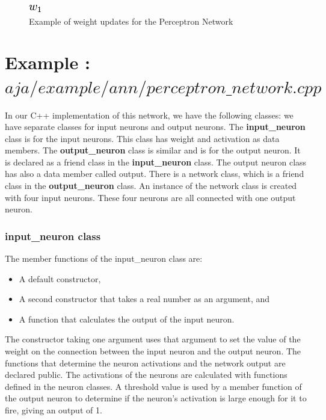 \documentclass[12pt, right open]{memoir}
\begin{document}
\begin{figure}
\caption{Example of weight updates for the Perceptron Network}
\label{tab:example_of_weight_update_for_the_perceptron_network}
\centering
\includegraphics[scale=.5]{example_weight_updates_perceptron_network.png}
\end{figure}

\section{Example : $aja/example/ann/perceptron\_network.cpp$}


In our C++ implementation of this network, we have the following classes: we have separate classes for input neurons and output neurons. The \textbf{input\_neuron} class is for the input neurons. This class has weight and activation as data members. The \textbf{output\_neuron} class is similar and is for the output neuron. It is declared as a friend class in the \textbf{input\_neuron} class. The output neuron class has also a data member called output. There is a network class, which is a friend class in the \textbf{output\_neuron} class. An instance of the network class is created with four input neurons. These four neurons are all connected with one output neuron.

\subsubsection{input\_neuron class}
The member functions of the input\_neuron class are: 
\begin{itemize}
\item A default constructor, 
\item A second constructor that takes a real number as an argument, and 
\item A function that calculates the output of the input neuron. \\
\end{itemize}


The constructor taking one argument uses that argument to set the value of the weight on the connection between the input neuron and the output neuron. The functions that determine the neuron activations and the network output are declared public. The activations of the neurons are calculated with functions defined in the neuron classes. A threshold value is used by a member function of the output neuron to determine if the neuron’s activation is
large enough for it to fire, giving an output of 1.
\end{document}
